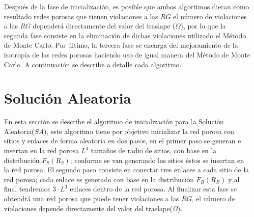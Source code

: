 Después de la fase de inicialización, es posible que ambos algoritmos dieran como resultado redes porosas que tienen violaciones a las $RG$ el número de violaciones a las $RG$ dependerá directamente del valor del traslape ($\Omega$), por lo que  la segunda fase consiste en la eliminación de dichas violaciones utilizado el Método de Monte Carlo. Por último, la tercera fase se  encarga del mejoramiento de la isotropía de las redes porosas haciendo uso de igual manera del Método de Monte Carlo. A continuación se describe a detalle cada algoritmo.




\section{Solución Aleatoria}
\label{sec:smcrg}
En esta sección se describe el algoritmo de inicialización para la Solución Aleatoria($SA$), este algoritmo tiene por objetivo inicializar la red porosa con sitios y enlaces de forma aleatoria en dos pasos, en el primer paso  se generan e insertan en la red porosa $L^3$ tamaños de radio de sitios, con base en la distribución $F_S(R_S)$; conforme se van  generando los sitios éstos  se insertan en la red porosa. El segundo paso consiste en conectar tres enlaces a cada sitio de la red porosa; cada enlace es generado  con base en la distribución $F_B(R_B)$ y al final tendremos $3 \cdot L^3$ enlaces dentro de la red porosa. Al finalizar esta fase se obtendrá una red porosa que puede tener violaciones a las $RG$, el número de violaciones depende directamente del valor del traslape($\Omega$).\\

